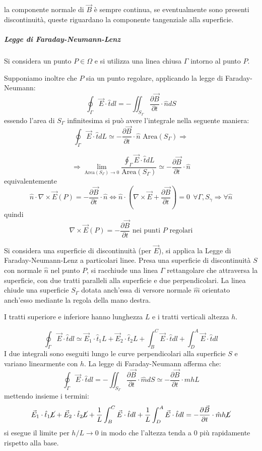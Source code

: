 la componente normale di $\vec{B}$ è sempre continua, se eventualmente sono presenti discontinuità,
queste riguardano la componente tangenziale alla superficie.

\subparagraph{Legge di Faraday-Neumann-Lenz}
Si considera un punto $P\in\Omega$ e si utilizza una linea chiusa $\Gamma$ intorno al punto $P$.

Supponiamo inoltre che $P$ sia un punto regolare, applicando la legge di Faraday-Neumann:
$$
\oint_{\Gamma}\vec{E}\cdot\hat{t}dl = 
- \iint_{S_\Gamma} \frac{\partial\vec{B}}{\partial t}\cdot\hat{n}dS
$$
essendo l'area di $S_\Gamma$ infinitesima si può avere l'integrale nella seguente maniera:
$$
\oint_{\Gamma}\vec{E}\cdot\hat{t}dL \simeq - \frac{\partial\vec{B}}{\partial t} \cdot 
\hat{n}\text{ Area}(S_\Gamma)\Rightarrow
$$

$$
\Rightarrow
\lim_{\text{Area}(S_\Gamma)\to 0}
 \frac{\oint_{\Gamma}\vec{E}\cdot\hat{t}dL}{\text{Area}(S_\Gamma)} \simeq
- \frac{\partial\vec{B}}{\partial t}\cdot\hat{n}
$$
equivalentemente
$$
\hat{n}\cdot\nabla\times\vec{E}(P) = -\frac{\partial\vec{B}}{\partial t}\cdot\hat{n} 
\Leftrightarrow \hat{n}\cdot\left(\nabla\times\vec{E}+\frac{\partial\vec{B}}{\partial t}\right) = 0\ \ 
\forall \Gamma,S_\gamma\Rightarrow \forall \hat{n}
$$
quindi
\begin{equation}
\nabla\times\vec{E}(P) = -\frac{\partial\vec{B}}{\partial t} \text{ nei punti $P$ regolari}
\end{equation}

Si considera una superficie di discontinuità (per $\vec{E}$), si applica la Legge di 
Faraday-Neumann-Lenz a particolari linee.
Presa una superficie di discontinuità $S$ con normale $\hat{n}$ nel punto $P$, si racchiude una linea
$\Gamma$ rettangolare che attraversa la superficie, con due tratti paralleli alla superficie e due
perpendicolari. La linea chiude una superficie $S_\Gamma$ dotata anch'essa di versore normale $\hat{m}$
orientato anch'esso mediante la regola della mano destra.

I tratti superiore e inferiore hanno lunghezza $L$ e i tratti verticali altezza $h$.

$$
\oint_{\Gamma}\vec{E}\cdot\hat{t}dl \simeq \vec{E}_1 \cdot\hat{t}_1 L + \vec{E}_2 \cdot\hat{t}_2 L +
\int_B^C \vec{E}\cdot\hat{t} dl + \int_D^A\vec{E}\cdot\hat{t}dl
$$
I due integrali sono eseguiti lungo le curve perpendicolari alla superficie $S$ e variano linearmente 
con $h$.
La legge di Faraday-Neumann afferma che:
$$
\oint_{\Gamma}\vec{E}\cdot\hat{t}dl = 
-\iint_{S_\Gamma} \frac{\partial\vec{B}}{\partial t}\cdot \hat{m}dS \simeq 
- \frac{\partial\vec{B}}{\partial t} \cdot \hat{m} h L
$$
mettendo insieme i termini:
$$
\vec{E}_1 \cdot\hat{t}_1 \cancel{L} + \vec{E}_2 \cdot\hat{t}_2 \cancel{L} +
\frac{1}{L}\int_B^C \vec{E}\cdot\hat{t} dl + \frac{1}{L}\int_D^A\vec{E}\cdot\hat{t}dl
= - \frac{\partial \vec{B}}{\partial t}\cdot \hat{m} h \cancel{L}
$$
si esegue il limite per $h/L \to 0$ in modo che l'altezza tenda a 0 più rapidamente rispetto
alla base.

